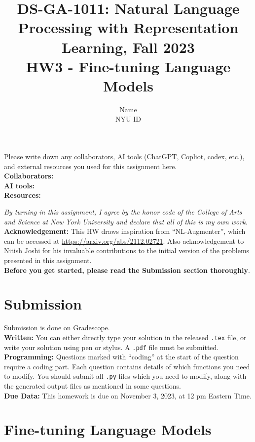 \documentclass{article}
\title{\textbf{DS-GA-1011: Natural Language Processing with Representation Learning, Fall 2023} \\HW3 - Fine-tuning Language Models}
\author{Name \\
NYU ID}
\date{}
\theoremstyle{case}
\theoremstyle{definition}
\begin{document}
\maketitle

\begin{tcolorbox}
Please write down any collaborators, AI tools (ChatGPT, Copliot, codex, etc.), and external resources you used for this assignment here. \\
\textbf{Collaborators:} \\
\textbf{AI tools:} \\
\textbf{Resources:}
\end{tcolorbox}
\textit{By turning in this assignment, I agree by the honor code of the College of Arts and Science at New York University and declare
that all of this is my own work.} \\

\textbf{Acknowledgement:} This HW draws inspiration from ``NL-Augmenter'', which can be accessed at \url{https://arxiv.org/abs/2112.02721}. Also acknowledgement to Nitish Joshi for his invaluable contributions to the initial version of the problems presented in this assignment. \\


\textbf{Before you get started, please read the Submission section thoroughly}.

\section*{Submission}
Submission is done on Gradescope. \\

\textbf{Written:} You can either directly type your solution in the released \texttt{.tex} file,
or write your solution using pen or stylus.
A \texttt{.pdf} file must be submitted.\\

\textbf{Programming:} Questions marked with ``coding'' at the start of the question require a coding part. Each question contains details of which functions you need to modify. You should submit all \texttt{.py} files which you need to modify, along with the generated output files as mentioned in some questions. \\

\textbf{Due Data:} This homework is due on November 3, 2023, at 12 pm Eastern Time.

\section*{Fine-tuning Language Models}
\end{document}

